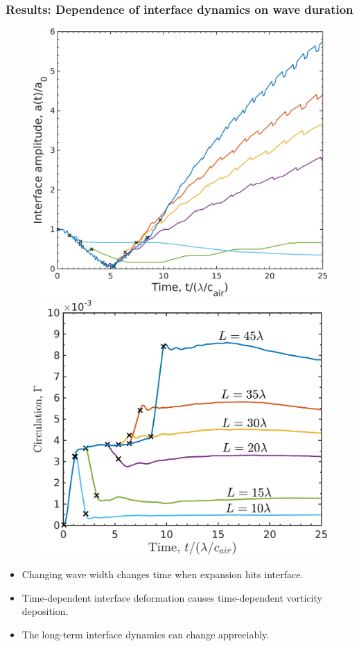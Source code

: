 \begin{frame}\frametitle{ \vspace*{0.5cm} Results: Dependence of interface dynamics on wave duration}
  \begin{figure}
    \centering
    \hfill%
    \includegraphics[height=0.52\textheight]{../figs/lung_figs/interface_multi-lag}\hfill%
    \includegraphics[height=0.53\textheight]{../figs/lung_figs/circulation_multi-lag_fixed}%
    \hfill%
  \end{figure}
  \begin{itemize}
  \item Changing wave width changes time when expansion hits interface.
  \item Time-dependent interface deformation causes time-dependent vorticity deposition.
  \item The long-term interface dynamics can change appreciably.
  \end{itemize}


\end{frame}
